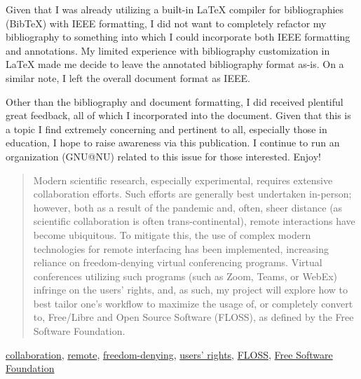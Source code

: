 \documentclass[conference]{IEEEtran}
\begin{document}
\begin{center}
\begin{tcolorbox}
    \begin{center}
    \end{center}
    \justifying
    \hspace{.25 in}    Given that I was already utilizing a built-in \LaTeX\hspace{.025 in} compiler for bibliographies (BibTeX) with IEEE formatting, I did not want to completely refactor my bibliography to something into which I could incorporate both IEEE formatting and annotations. My limited experience with bibliography customization in \LaTeX\hspace{.025 in} made me decide to leave the annotated bibliography format as-is. On a similar note, I left the overall document format as IEEE.
    \vspace{-25pt}
    \begin{center}
    \end{center}
    \justifying
    \hspace{.25 in}    Other than the bibliography and document formatting, I did received plentiful great feedback, all of which I incorporated into the document. Given that this is a topic I find extremely concerning and pertinent to all, especially those in education, I hope to raise awareness via this publication. I continue to run an organization (GNU@NU) related to this issue for those interested. Enjoy!
  \end{tcolorbox}
\end{center}

\begin{abstract}
  Modern scientific research, especially experimental, requires extensive collaboration efforts. Such efforts are generally best undertaken in-person; however, both as a result of the pandemic and, often, sheer distance (as scientific collaboration is often trans-continental), remote interactions have become ubiquitous. To mitigate this, the use of complex modern technologies for remote interfacing has been implemented, increasing reliance on freedom-denying virtual conferencing programs. Virtual conferences utilizing such programs (such as Zoom, Teams, or WebEx) infringe on the users' rights, and, as such, my project will explore how to best tailor one's workflow to maximize the usage of, or completely convert to, Free/Libre and Open Source Software (FLOSS), as defined by the Free Software Foundation.
\end{abstract}

\begin{IEEEkeywords}
  \underline{collaboration}, \underline{remote}, \underline{freedom-denying}, \underline{users' rights}, \underline{FLOSS}, \underline{Free Software Foundation}
\end{IEEEkeywords}
\end{document}

